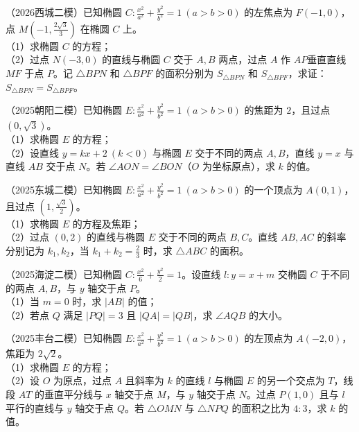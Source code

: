 \begin{example} %
（2026西城二模）已知椭圆 $C:\frac{x^2}{a^2}+\frac{y^2}{b^2}=1\ (a>b>0)$ 的左焦点为 $F(-1,0)$，点 $M\left(-1,\frac{2\sqrt{3}}{3}\right)$ 在椭圆 $C$ 上。\\
（1）求椭圆 $C$ 的方程；\\
（2）过点 $N(-3,0)$ 的直线与椭圆 $C$ 交于 $A,B$ 两点，过点 $A$ 作 $AP$垂直直线$ MF$ 于点 $P$。记 $\triangle BPN$ 和 $\triangle BPF$ 的面积分别为 $S_{\triangle BPN}$ 和 $S_{\triangle BPF}$，求证：$S_{\triangle BPN}=S_{\triangle BPF}$。
\end{example}

\begin{example} %
（2025朝阳二模）已知椭圆 $E:\frac{x^2}{a^2}+\frac{y^2}{b^2}=1\ (a>b>0)$ 的焦距为 $2$，且过点 $(0,\sqrt{3})$。\\
（1）求椭圆 $E$ 的方程；\\
（2）设直线 $y=kx+2\ (k<0)$ 与椭圆 $E$ 交于不同的两点 $A,B$，直线 $y=x$ 与直线 $AB$ 交于点 $N$。若 $\angle AON=\angle BON$（$O$ 为坐标原点），求 $k$ 的值。
\end{example}

\begin{example} %
（2025东城二模）已知椭圆 $E:\frac{x^2}{a^2}+\frac{y^2}{b^2}=1\ (a>b>0)$ 的一个顶点为 $A(0,1)$，且过点 $\left(1,\frac{\sqrt{3}}{2}\right)$。\\
（1）求椭圆 $E$ 的方程及焦距；\\
（2）过点 $(0,2)$ 的直线与椭圆 $E$ 交于不同的两点 $B,C$。直线 $AB,AC$ 的斜率分别记为 $k_1,k_2$，当 $k_1+k_2=\frac{2}{3}$ 时，求 $\triangle ABC$ 的面积。
\end{example}

\begin{example} %
（2025海淀二模）已知椭圆 $C:\frac{x^2}{6}+\frac{y^2}{2}=1$。设直线 $l:y=x+m$ 交椭圆 $C$ 于不同的两点 $A,B$，与 $y$ 轴交于点 $P$。\\
（1）当 $m=0$ 时，求 $\lvert AB\rvert$ 的值；\\
（2）若点 $Q$ 满足 $\lvert PQ\rvert=3$ 且 $\lvert QA\rvert=\lvert QB\rvert$，求 $\angle AQB$ 的大小。
\end{example}

\begin{example} %
（2025丰台二模）已知椭圆 $E:\frac{x^2}{a^2}+\frac{y^2}{b^2}=1\ (a>b>0)$ 的左顶点为 $A(-2,0)$，焦距为 $2\sqrt{2}$。\\
（1）求椭圆 $E$ 的方程；\\
（2）设 $O$ 为原点，过点 $A$ 且斜率为 $k$ 的直线 $l$ 与椭圆 $E$ 的另一个交点为 $T$，线段 $AT$ 的垂直平分线与 $x$ 轴交于点 $M$，与 $y$ 轴交于点 $N$。过点 $P(1,0)$ 且与 $l$ 平行的直线与 $y$ 轴交于点 $Q$。若 $\triangle OMN$ 与 $\triangle NPQ$ 的面积之比为 $4:3$，求 $k$ 的值。
\end{example}

